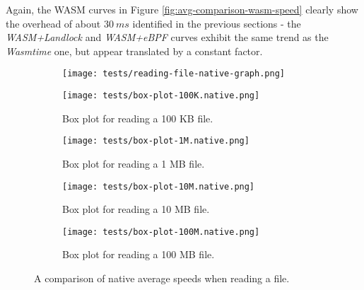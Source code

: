 Again, the WASM curves in Figure \ref{fig:avg-comparison-wasm-speed} clearly show the overhead
of about $30\ ms$ identified in the previous sections - the \textit{WASM+Landlock} and \textit{WASM+eBPF} curves
exhibit the same trend as the \textit{Wasmtime} one, but appear translated by a constant factor.

\begin{figure}[ht!]
  \centering
  \begin{subfigure}[b]{0.78\textwidth}
    \centering
    \texttt{[image: tests/reading-file-native-graph.png]}
  \end{subfigure}

  \begin{subfigure}[b]{0.45\textwidth}
    \centering
    \texttt{[image: tests/box-plot-100K.native.png]}
    \caption{Box plot for reading a 100 KB file.}
  \end{subfigure}
  \begin{subfigure}[b]{0.45\textwidth}
    \centering
    \texttt{[image: tests/box-plot-1M.native.png]}
    \caption{Box plot for reading a 1 MB file.}
  \end{subfigure}
  \begin{subfigure}[b]{0.45\textwidth}
    \centering
    \texttt{[image: tests/box-plot-10M.native.png]}
    \caption{Box plot for reading a 10 MB file.}
  \end{subfigure}
  \begin{subfigure}[b]{0.45\textwidth}
    \centering
    \texttt{[image: tests/box-plot-100M.native.png]}
    \caption{Box plot for reading a 100 MB file.}
  \end{subfigure}

  \caption{A comparison of native average speeds when reading a file.}
  \label{fig:avg-comparison-native-speed}
\end{figure}

